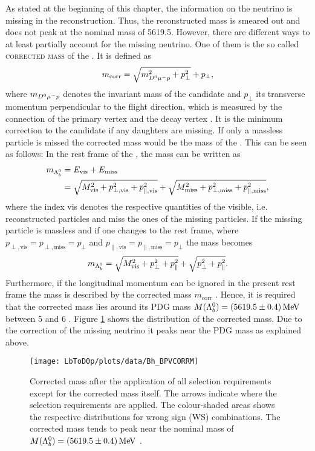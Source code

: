 As stated at the beginning of this chapter, the information on the neutrino is missing in the reconstruction.
Thus, the reconstructed \Lb mass is smeared out and does not peak at the nominal \Lb mass of 5619.5\mev.
However, there are different ways to at least partially account for the missing neutrino.
One of them is the so called \textsc{corrected mass} of the \Lb.
It is defined as
\begin{align}
    m_{\text{corr}} = \sqrt{m_{{{D}^0}{\mu^-}{p}}^2 + p_{\perp}^2} + p_{\perp}, \label{eq:correctedMass}
\end{align}
where $m_{{{D}^0}{\mu^-}{p}}$ denotes the invariant mass of the \Dz\mun\proton candidate and $p_\perp$ its transverse momentum perpendicular to the \Lb flight direction, which is measured by the connection of the primary vertex and the \Lb decay vertex \cite{CorrectedMass}.
It is the minimum correction to the \Lb candidate if any daughters are missing.
If only a massless particle is missed the corrected mass would be the mass of the \Lb \cite{HLT2_Topological}.
This can be seen as follows:
In the rest frame of the \Lb, the \Lb mass can be written as
\begin{align}
    m_{{{\Lambda}^0_{b}}} &= E_{\text{vis}} + E_{\text{miss}} \\
            &= \sqrt{M_{\text{vis}}^2 + p_{\perp, \text{vis}}^2 + p_{\parallel, \text{vis}}^2} + \sqrt{M_{\text{miss}}^2 + p_{\perp, \text{miss}}^2 + p_{\parallel, \text{miss}}^2},
\end{align}
where the index vis denotes the respective quantities of the visible, i.e. reconstructed particles and miss the ones of the missing particles.
If the missing particle is massless and if one changes to the \Lb rest frame, where $p_{\perp, \text{vis}} = p_{\perp, \text{miss}} = p_\perp$ and $p_{\parallel, \text{vis}} = p_{\parallel, \text{miss}} = p_\perp$ the \Lb mass becomes
\begin{align}
    m_{{{\Lambda}^0_{b}}} = \sqrt{M_{\text{vis}}^2 + p_{\perp}^2 + p_{\parallel}^2} + \sqrt{p_{\perp}^2 + p_{\parallel}^2}.
\end{align}
Furthermore, if the longitudinal momentum can be ignored in the present rest frame the \Lb mass is described by the corrected mass $m_\text{corr}$ \cite{bQuark_LEP, Kodama:1991ij}.
Hence, it is required that the corrected \Lb mass lies around its PDG mass $M({{\Lambda}^0_{b}})=(5619.5 \pm 0.4)\mathrm{\,Me\kern -0.1em V}$ \cite{PDG} between 5 and 6 \gev.
Figure \ref{fig:plot_correctedMass} shows the distribution of the corrected \Lb mass.
Due to the correction of the missing neutrino it peaks near the PDG mass as explained above.
\begin{figure}[hptb]
	\centering
	\texttt{[image: LbToD0p/plots/data/Bh\_BPVCORRM]}
	\caption{Corrected \Lb mass after the application of all selection requirements except for the corrected \Lb mass itself.
             The arrows indicate where the selection requirements are applied.
             The colour-shaded areas shows the respective distributions for wrong sign (WS) combinations.
             The corrected \Lb mass tends to peak near the nominal \Lb mass of $M({{\Lambda}^0_{b}})=(5619.5 \pm 0.4)\mathrm{\,Me\kern -0.1em V}$ \cite{PDG}.}
	\label{fig:plot_correctedMass}
\end{figure}

